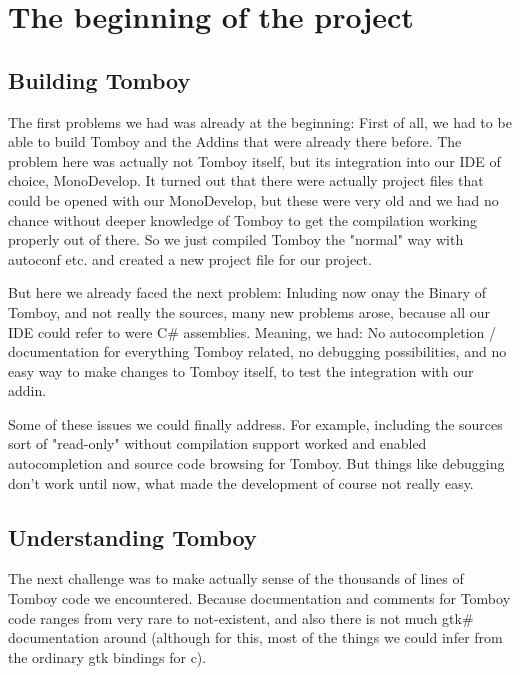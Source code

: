 \documentclass[11pt,a4paper,titlepage]{article}
\begin{document}



\section{The beginning of the project} %

\subsection{Building Tomboy}
The first problems we had was already at the beginning: First of all, we had to be able to build Tomboy and the Addins that were already there before. The problem here was actually not Tomboy itself, but its integration into our IDE of choice, MonoDevelop. It turned out that there were actually project files that could be opened with our MonoDevelop, but these were very old and we had no chance without deeper knowledge of Tomboy to get the compilation working properly out of there. So we just compiled Tomboy the "normal" way with autoconf etc. and created a new project file for our project.

But here we already faced the next problem: Inluding now onay the Binary of Tomboy, and not really the sources, many new problems arose, because all our IDE could refer to were C\# assemblies. Meaning, we had: No autocompletion / documentation for everything Tomboy related, no debugging possibilities, and no easy way to make changes to Tomboy itself, to test the integration with our addin.

Some of these issues we could finally address. For example, including the sources sort of "read-only" without compilation support worked and enabled autocompletion and source code browsing for Tomboy. But things like debugging don't work until now, what made the development of course not really easy.

\subsection{Understanding Tomboy}
The next challenge was to make actually sense of the thousands of lines of Tomboy code we encountered. Because documentation and comments for Tomboy code ranges from very rare to not-existent, and also there is not much gtk\# documentation around (although for this, most of the things we could infer from the ordinary gtk bindings for c).
\end{document}
